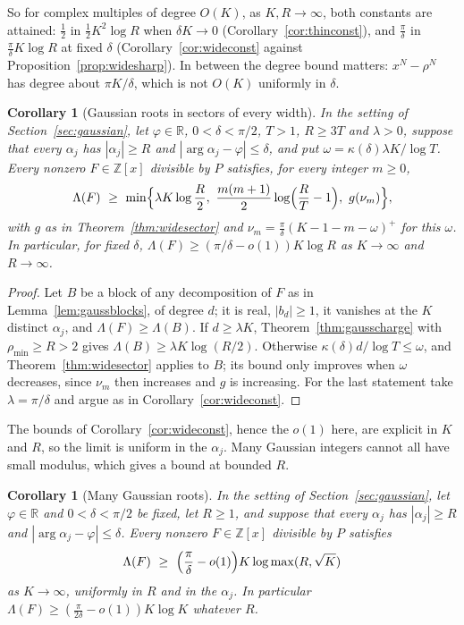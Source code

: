 \documentclass[11pt]{article}
\newtheorem{corollary}[theorem]{Corollary}
\newcommand{\R}{\mathbb R}
\begin{document}
So for complex multiples of degree $O(K)$, as $K,R\to\infty$, both constants
are attained: $\frac12$ in $\frac12K^2\log R$ when $\delta K\to0$
(Corollary~\ref{cor:thinconst}), and $\frac\pi\delta$ in $\frac\pi\delta K\log R$ at
fixed $\delta$ (Corollary~\ref{cor:wideconst} against
Proposition~\ref{prop:widesharp}).  In between the degree bound matters:
$x^N-\rho^N$ has degree about $\pi K/\delta$, which is not $O(K)$ uniformly
in $\delta$.

\begin{corollary}[Gaussian roots in sectors of every width]\label{cor:widegauss}
In the setting of Section~\ref{sec:gaussian}, let $\varphi\in\R$,
$0<\delta<\pi/2$, $T>1$, $R\ge3T$ and $\lambda>0$, suppose that every
$\alpha_j$ has $|\alpha_j|\ge R$ and $|\arg\alpha_j-\varphi|\le\delta$, and put
$\omega=\kappa(\delta)\lambda K/\log T$.  Every nonzero $F\in\mathbb Z[x]$ divisible
by $P$ satisfies, for every integer $m\ge0$,
\[
  \Lambda(F)\ \ge\ \min\Bigl\{\lambda K\log\frac R2,\
  \frac{m(m+1)}2\log\Bigl(\frac RT-1\Bigr),\ g(\nu_m)\Bigr\},
\]
with $g$ as in Theorem~\ref{thm:widesector} and
$\nu_m=\frac\pi\delta(K-1-m-\omega)^+$ for this $\omega$.  In particular, for fixed
$\delta$, $\Lambda(F)\ge(\pi/\delta-o(1))K\log R$ as $K\to\infty$ and
$R\to\infty$.
\end{corollary}

\begin{proof}
Let $B$ be a block of any decomposition of $F$ as in
Lemma~\ref{lem:gaussblocks}, of degree $d$; it is
real, $|b_d|\ge1$, it vanishes at the $K$ distinct $\alpha_j$, and
$\Lambda(F)\ge\Lambda(B)$.  If $d\ge\lambda K$, Theorem~\ref{thm:gausscharge}
with $\rho_{\min}\ge R>2$ gives $\Lambda(B)\ge\lambda K\log(R/2)$.  Otherwise
$\kappa(\delta)d/\log T\le\omega$, and Theorem~\ref{thm:widesector} applies to $B$;
its bound only improves when $\omega$ decreases, since $\nu_m$ then
increases and $g$ is increasing.  For the last statement take
$\lambda=\pi/\delta$ and argue as in Corollary~\ref{cor:wideconst}.
\end{proof}

The bounds of Corollary~\ref{cor:wideconst}, hence the $o(1)$ here, are
explicit in $K$ and $R$, so the limit is uniform in the $\alpha_j$.  Many
Gaussian integers cannot all have small modulus, which gives a bound
at bounded $R$.

\begin{corollary}[Many Gaussian roots]\label{cor:gausscount}
In the setting of Section~\ref{sec:gaussian}, let $\varphi\in\R$ and
$0<\delta<\pi/2$ be fixed, let $R\ge1$, and suppose that every $\alpha_j$
has $|\alpha_j|\ge R$ and $|\arg\alpha_j-\varphi|\le\delta$.  Every nonzero
$F\in\mathbb Z[x]$ divisible by $P$ satisfies
\[
  \Lambda(F)\ \ge\ \Bigl(\frac\pi\delta-o(1)\Bigr)K\log\max(R,\sqrt K)
\]
as $K\to\infty$, uniformly in $R$ and in the $\alpha_j$.  In particular
$\Lambda(F)\ge(\frac\pi{2\delta}-o(1))K\log K$ whatever $R$.
\end{corollary}
\end{document}
